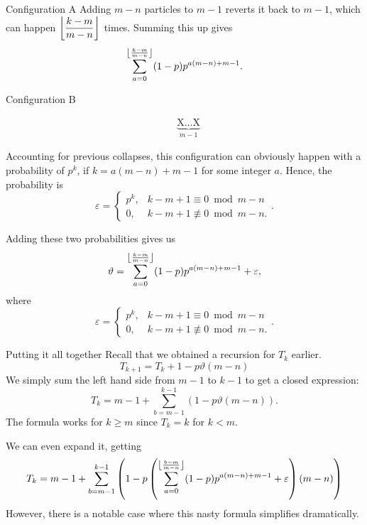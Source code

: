 \documentclass[xcolor={usenames,dvipsnames}]{beamer}
\DeclarePairedDelimiter\floor{\lfloor}{\rfloor}
\begin{document}
  \begin{frame}{Configuration A}
    Adding $m-n$ particles to $m-1$ reverts it back to $m-1$, which can happen $\floor*{\dfrac{k-m}{m-n}}$ times. Summing this up gives \[\sum_{a = 0}^{\floor*{\frac{k-m}{m-n}}} (1-p)p^{a(m-n) + m-1}.\]
\end{frame}
\begin{frame}{Configuration B}
    \begin{figure}[H]
    \vspace{-1.5em}
    \begin{align*}
        &\underbrace{\text{X}\dots\text{X}}_{m-1} \tag{B}
    \end{align*}
    \vspace{-2em}
  \end{figure}
  Accounting for previous collapses, this configuration can obviously happen with a probability of $p^{k}$, if $k = a(m-n) + m-1$ for some integer $a$. Hence, the probability is \[
    \varepsilon = \begin{cases} p^{k}, &k-m+1 \equiv 0 \bmod m-n \\ 0, &k-m+1 \not\equiv 0 \bmod m-n. \end{cases}
  .\] 
\end{frame}
\begin{frame}
  Adding these two probabilities gives us \[
    \vartheta = \sum_{a=0}^{\floor*{\frac{k-m}{m-n}}} (1-p)p^{a(m-n)+m-1} + \varepsilon,
  \] where \[
    \varepsilon = \begin{cases} p^{k}, &k-m+1 \equiv 0 \bmod m-n \\ 0, &k-m+1 \not\equiv 0 \bmod m-n. \end{cases}
  .\] 
\end{frame}

\begin{frame}{Putting it all together}
  Recall that we obtained a recursion for  $T_k$ earlier.
  \[T_{k+1} = T_k + 1 - p\vartheta(m - n)\]
  We simply sum the left hand side from $m-1$ to $k-1$ to get a closed expression:
  \begin{equation*}
  T_k = m-1 + \sum_{b=m-1}^{k-1} \left(1-p\vartheta(m-n)\right).
  \end{equation*}
  The formula works for $k \ge m$ since $T_k = k$ for  $k<m$.
\end{frame}

\begin{frame}
  We can even expand it, getting
  \[
  T_k = m-1+\sum _{b=m-1}^{k-1} \left(1-p \left(\sum _{a=0}^{\floor*{\frac{b-m}{m-n}} } (1-p) p^{a (m-n)+m-1}+\varepsilon\right) (m-n)\right)
  \] However, there is a notable case where this nasty formula simplifies dramatically.
\end{frame}
\end{document}
